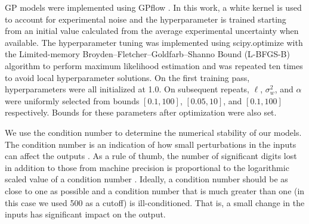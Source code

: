 \documentclass[journal=jacsat,manuscript=article]{achemso}
\begin{document}
GP models were implemented using GPflow \cite{Matthews2017GPflow:TensorFlow}. In this work, a white kernel is used to account for experimental noise and the hyperparameter is trained starting from an initial value calculated from the average experimental uncertainty when available. The hyperparameter tuning was implemented using scipy.optimize \cite{Virtanen2020SciPyPython} with the Limited-memory Broyden–Fletcher–Goldfarb–Shanno Bound (L-BFGS-B) algorithm to perform maximum likelihood estimation and was repeated ten times to avoid local hyperparameter solutions. On the first training pass, hyperparameters were all initialized at 1.0. On subsequent repeats, $\ell$, $\sigma^2_w$, and $\alpha$ were uniformly selected from bounds $[0.1, 100]$, $[0.05, 10]$, and $[0.1, 100]$  respectively. Bounds for these parameters after optimization were also set.

We use the condition number to determine the numerical stability of our models. The condition number is an indication of how small perturbations in the inputs can affect the outputs \cite{Foster2009}. As a rule of thumb, the number of significant digits lost in addition to those from machine precision is proportional to the logarithmic scaled value of a condition number \cite{NumMathComput}. Ideally, a condition number should be as close to one as possible and a condition number that is much greater than one (in this case we used 500 as a cutoff) is ill-conditioned. That is, a small change in the inputs has significant impact on the output.
\end{document}
